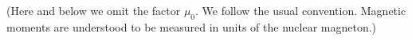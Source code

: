 (Here and below we omit the factor $\mu_0$. We follow the usual convention.
Magnetic moments are understood to be measured in units of the nuclear magneton.)

